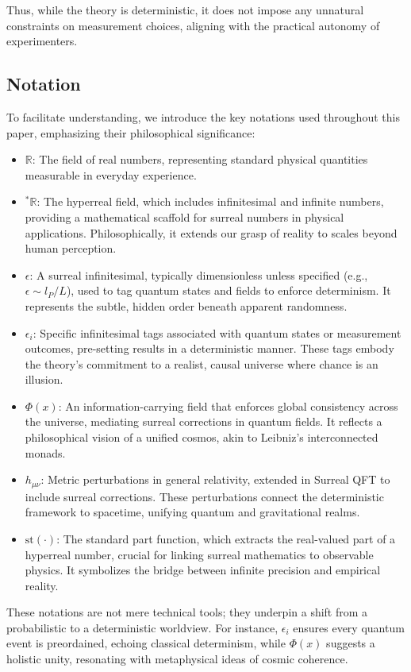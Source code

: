 \documentclass{article}
\begin{document}
Thus, while the theory is deterministic, it does not impose any unnatural constraints on measurement choices, aligning with the practical autonomy of experimenters.

\subsection{Notation}
To facilitate understanding, we introduce the key notations used throughout this paper, emphasizing their philosophical significance:
\begin{itemize}
    \item \(\mathbb{R}\): The field of real numbers, representing standard physical quantities measurable in everyday experience.
    \item \({}^*\mathbb{R}\): The hyperreal field, which includes infinitesimal and infinite numbers, providing a mathematical scaffold for surreal numbers in physical applications. Philosophically, it extends our grasp of reality to scales beyond human perception.
    \item \(\epsilon\): A surreal infinitesimal, typically dimensionless unless specified (e.g., \(\epsilon \sim l_P / L\)), used to tag quantum states and fields to enforce determinism. It represents the subtle, hidden order beneath apparent randomness.
    \item \(\epsilon_i\): Specific infinitesimal tags associated with quantum states or measurement outcomes, pre-setting results in a deterministic manner. These tags embody the theory's commitment to a realist, causal universe where chance is an illusion.
    \item \(\Phi(x)\): An information-carrying field that enforces global consistency across the universe, mediating surreal corrections in quantum fields. It reflects a philosophical vision of a unified cosmos, akin to Leibniz's interconnected monads.
    \item \(h_{\mu\nu}\): Metric perturbations in general relativity, extended in Surreal QFT to include surreal corrections. These perturbations connect the deterministic framework to spacetime, unifying quantum and gravitational realms.
    \item \(\text{st}(\cdot)\): The standard part function, which extracts the real-valued part of a hyperreal number, crucial for linking surreal mathematics to observable physics. It symbolizes the bridge between infinite precision and empirical reality.
\end{itemize}
These notations are not mere technical tools; they underpin a shift from a probabilistic to a deterministic worldview. For instance, \(\epsilon_i\) ensures every quantum event is preordained, echoing classical determinism, while \(\Phi(x)\) suggests a holistic unity, resonating with metaphysical ideas of cosmic coherence.
\end{document}
